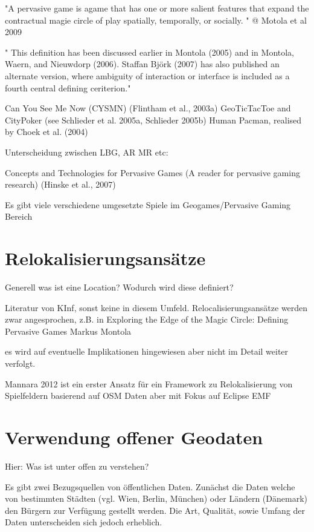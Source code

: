 "A pervasive game is agame that has one or more salient features that expand the 
contractual magie circle of play spatially, temporally, or socially. " @ Motola et al 2009

" This   definition   has   been   discussed   earlier  in   Montola   (2005)   and   in   Montola,   Waern,   and 
Nieuwdorp  (2006).  Staffan  Björk  (2007)  has  also  published  an  alternate version,  where  ambiguity 
of  interaction or  interface is  included  as  a  fourth  central  defining ceriterion." 

Can You See Me Now (CYSMN) (Flintham et al., 2003a)
GeoTicTacToe and CityPoker (see Schlieder et al. 2005a, Schlieder 2005b)
Human Pacman, realised by Choek et al. (2004)

Unterscheidung zwischen LBG, AR MR etc:

Concepts and Technologies for Pervasive Games (A reader for pervasive gaming research) (Hinske et al., 2007)

Es gibt viele verschiedene umgesetzte Spiele im Geogames/Pervasive Gaming Bereich

\section{Relokalisierungsansätze}

Generell was ist eine Location?
Wodurch wird diese definiert?


Literatur von KInf, sonst keine in diesem Umfeld.
Relocalisierungsansätze werden zwar angesprochen, z.B. in 
Exploring the Edge of the Magic Circle: 
Defining Pervasive Games 
Markus Montola 

es wird auf eventuelle Implikationen hingewiesen aber nicht im Detail weiter verfolgt.

Mannara 2012 ist ein erster Ansatz für ein Framework zu Relokalisierung von Spielfeldern basierend auf OSM Daten aber mit Fokus auf Eclipse EMF

\section{Verwendung offener Geodaten}
\label{subsec:S3_offeneGeodaten}

Hier: Was ist unter offen zu verstehen?

Es gibt zwei Bezugsquellen von öffentlichen Daten.
Zunächst die Daten welche von bestimmten Städten (vgl. Wien, Berlin, München) oder Ländern (Dänemark) den Bürgern zur Verfügung gestellt werden. Die Art, Qualität, sowie Umfang der Daten unterscheiden sich jedoch erheblich.

